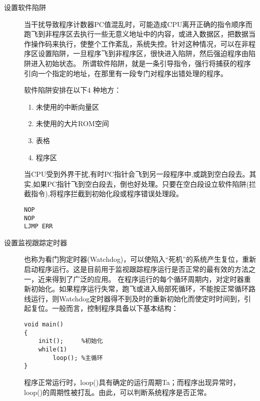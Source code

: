\begin{description}
  \item[设置软件陷阱]     当干扰导致程序计数器PC值混乱时，可能造成CPU离开正确的指令顺序而跑飞到非程序区去执行一些无意义地址中的内容，或进入数据区，把数据当作操作码来执行，使整个工作紊乱，系统失控。针对这种情况，可以在非程序区设置陷阱，一旦程序飞到非程序区，很快进入陷阱，然后强迫程序由陷阱进入初始状态。
    所谓软件陷阱，就是一条引导指令，强行将捕获的程序引向一个指定的地址，在那里有一段专门对程序出错处理的程序。

    软件陷阱安排在以下4 种地方：

    \begin{enumerate}
      \item 未使用的中断向量区
      \item 未使用的大片ROM空间
      \item 表格
      \item 程序区
    \end{enumerate}
\begin{remark}
  当CPU受到外界干扰,有时PC指针会飞到另一段程序中,或跳到空白段去。其实,如果PC指针飞到空白段去，倒也好处理。只要在空白段设立软件陷阱(拦截指令),将程序拦截到初始化段或程序错误处理段。

\begin{verbatim}
NOP
NOP
LJMP ERR
\end{verbatim}

\end{remark}

  \item[设置监视跟踪定时器] 也称为看门狗定时器(Watchdog)，可以使陷入“死机”的系统产生复位，重新启动程序运行。这是目前用于监视跟踪程序运行是否正常的最有效的方法之一，近来得到了广泛的应用。
    在程序运行的每个循环周期内，对定时器重新初始化。如果程序运行失常，跑飞或进入局部死循环，不能按正常循环路线运行，则Watchdog定时器得不到及时的重新初始化而使定时时间到，引起复位。一般而言，控制程序具备以下基本结构：

\begin{verbatim}
void main()
{
    init();     %初始化
    while(1)
        loop(); %主循环
}
\end{verbatim}



\begin{remark}
程序正常运行时，loop()具有确定的运行周期Ta；而程序出现异常时，loop()的周期性被打乱。由此，可以判断系统程序是否正常。


\end{remark}



\end{description}
